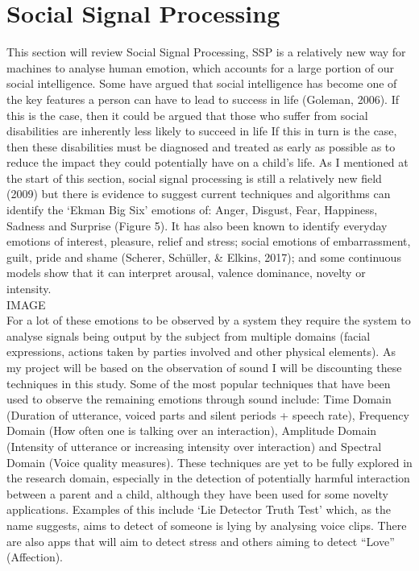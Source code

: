 \documentclass[a4paper,11pt]{report}
\begin{document}
\section{Social Signal Processing}
This section will review Social Signal Processing, SSP is a relatively new way for machines to analyse human emotion, which accounts for a large portion of our social intelligence. Some have argued that social intelligence has become one of the key features a person can have to lead to success in life (Goleman, 2006). If this is the case, then it could be argued that those who suffer from social disabilities are inherently less likely to succeed in life If this in turn is the case, then these disabilities must be diagnosed and treated as early as possible as to reduce the impact they could potentially have on a child’s life. As I mentioned at the start of this section, social signal processing is still a relatively new field (2009) but there is evidence to suggest current techniques and algorithms can identify the ‘Ekman Big Six’ emotions of: Anger, Disgust, Fear, Happiness, Sadness and Surprise (Figure 5). It has also been known to identify everyday emotions of interest, pleasure, relief and stress; social emotions of embarrassment, guilt, pride and shame (Scherer, Schüller, \& Elkins, 2017); and some continuous models show that it can interpret arousal, valence dominance, novelty or intensity. \\

IMAGE\\

For a lot of these emotions to be observed by a system they require the system to analyse signals being output by the subject from multiple domains (facial expressions, actions taken by parties involved and other physical elements). As my project will be based on the observation of sound I will be discounting these techniques in this study. Some of the most popular techniques that have been used to observe the remaining emotions through sound include: Time Domain (Duration of utterance, voiced parts and silent periods + speech rate), Frequency Domain (How often one is talking over an interaction), Amplitude Domain (Intensity of utterance or increasing intensity over interaction) and Spectral Domain (Voice quality measures). These techniques are yet to be fully explored in the research domain, especially in the detection of potentially harmful interaction between a parent and a child, although they have been used for some novelty applications. Examples of this include ‘Lie Detector Truth Test’   which, as the name suggests, aims to detect of someone is lying by analysing voice clips. There are also apps that will aim to detect stress and others aiming to detect “Love” (Affection). \\
 
\end{document}
